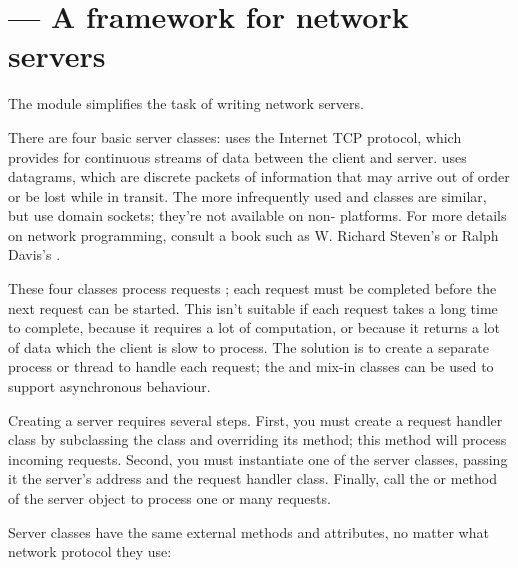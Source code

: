 \section{ ---
         A framework for network servers}



The  module simplifies the task of writing network
servers.

There are four basic server classes:  uses the
Internet TCP protocol, which provides for continuous streams of data
between the client and server.   uses datagrams, which
are discrete packets of information that may arrive out of order or be
lost while in transit.  The more infrequently used
 and  classes are
similar, but use \UNIX{} domain sockets; they're not available on
non-\UNIX{} platforms.  For more details on network programming, consult
a book such as W. Richard Steven's 
or Ralph Davis's .

These four classes process requests ; each request
must be completed before the next request can be started.  This isn't
suitable if each request takes a long time to complete, because it
requires a lot of computation, or because it returns a lot of data
which the client is slow to process.  The solution is to create a
separate process or thread to handle each request; the
 and  mix-in classes can be
used to support asynchronous behaviour.

Creating a server requires several steps.  First, you must create a
request handler class by subclassing the 
class and overriding its  method; this method will
process incoming requests.  Second, you must instantiate one of the
server classes, passing it the server's address and the request
handler class.  Finally, call the  or
 method of the server object to process one or
many requests.

Server classes have the same external methods and attributes, no
matter what network protocol they use:



